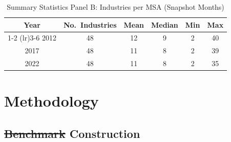 \documentclass[
  12pt,
]{article}
\providecommand{\DIFaddtex}[1]{{\protect\color{blue}\uwave{#1}}} %
\providecommand{\DIFdeltex}[1]{{\protect\color{red}\sout{#1}}}                      %
\providecommand{\DIFaddbegin}{} %
\providecommand{\DIFaddend}{} %
\providecommand{\DIFdelbegin}{} %
\providecommand{\DIFdelend}{} %
\providecommand{\DIFadd}[1]{\texorpdfstring{\DIFaddtex{#1}}{#1}} %
\providecommand{\DIFdel}[1]{\texorpdfstring{\DIFdeltex{#1}}{}} %
\newcommand{\DIFscaledelfig}{0.5}
\newlength{\DIFdelgraphicswidth} %
\newlength{\DIFdelgraphicsheight} %
\newcommand{\DIFaddincludegraphics}[2][]{{\color{blue}\fbox{\DIFOincludegraphics[#1]{#2}}}} %
\newcommand{\DIFdelincludegraphics}[2][]{%
\sbox{\DIFdelgraphicsbox}{\DIFOincludegraphics[#1]{#2}}%
\settoboxwidth{\DIFdelgraphicswidth}{\DIFdelgraphicsbox} %
\settoboxtotalheight{\DIFdelgraphicsheight}{\DIFdelgraphicsbox} %
\scalebox{\DIFscaledelfig}{%
\parbox[b]{\DIFdelgraphicswidth}{\usebox{\DIFdelgraphicsbox}\\[-\baselineskip] \rule{\DIFdelgraphicswidth}{0em}}\llap{\resizebox{\DIFdelgraphicswidth}{\DIFdelgraphicsheight}{%
\setlength{\unitlength}{\DIFdelgraphicswidth}%
\begin{picture}(1,1)%
\thicklines\linethickness{2pt} %
{\color[rgb]{1,0,0}\put(0,0){\framebox(1,1){}}}%
{\color[rgb]{1,0,0}\put(0,0){\line( 1,1){1}}}%
{\color[rgb]{1,0,0}\put(0,1){\line(1,-1){1}}}%
\end{picture}%
}\hspace*{3pt}}} %
} %
\DeclareRobustCommand{\DIFaddbegin}{\DIFOaddbegin \let\includegraphics\DIFaddincludegraphics} %
\DeclareRobustCommand{\DIFaddend}{\DIFOaddend \let\includegraphics\DIFOincludegraphics} %
\DeclareRobustCommand{\DIFdelbegin}{\DIFOdelbegin \let\includegraphics\DIFdelincludegraphics} %
\DeclareRobustCommand{\DIFdelend}{\DIFOaddend \let\includegraphics\DIFOincludegraphics} %
\begin{document}
\DIFdelbegin %
\DIFdelend \DIFaddbegin \begin{table}[!h]
\centering
\caption{Summary Statistics Panel B: Industries per MSA (Snapshot Months)}
\fontsize{10}{12}\selectfont
\begin{tabular}{cccccc}
\toprule
Year & No.\ Industries & Mean & Median & Min & Max \\
\cmidrule(lr){1-2} \cmidrule(lr){3-6}
2012 & 48 & 12 & 9 & 2 & 40 \\
2017 & 48 & 11 & 8 & 2 & 39 \\
2022 & 48 & 11 & 8 & 2 & 35 \\
\bottomrule
\end{tabular}
\end{table}
\DIFaddend 

\section{Methodology}\label{methodology}

\subsection{\DIFdelbegin \DIFdel{Benchmark }\DIFdelend \DIFaddbegin \DIFadd{Index }\DIFaddend Construction}\DIFdelbegin %
\DIFdelend \DIFaddbegin \label{index-construction}
\DIFaddend 
\end{document}
